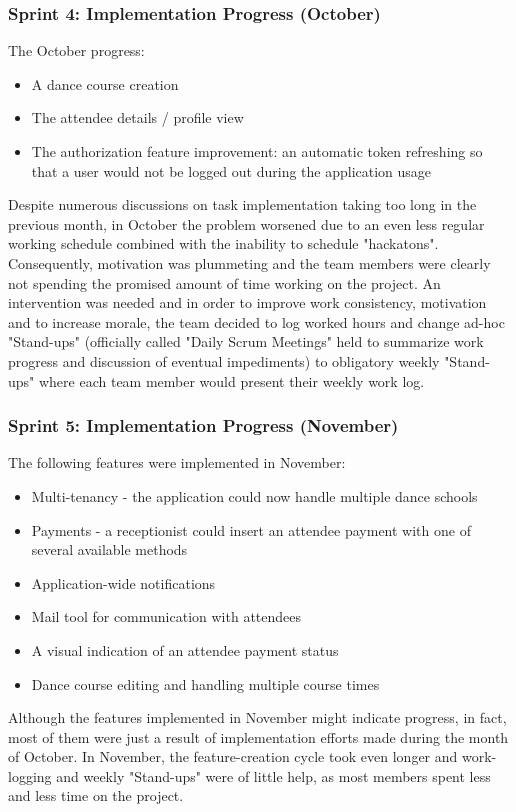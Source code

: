 \documentclass{article}
\begin{document}
\subsubsection{Sprint 4: Implementation Progress (October)}
The October progress:
\begin{itemize}
\item A dance course creation
\item The attendee details / profile view
\item The authorization feature improvement: an automatic token refreshing so that a user would not be logged out during the application usage
\end{itemize}

Despite numerous discussions on task implementation taking too long in the previous month, in October the problem worsened due to an even less regular working schedule combined with the inability to schedule "hackatons". Consequently, motivation was plummeting and the team members were clearly not spending the promised amount of time working on the project. An intervention was needed and in order to improve work consistency, motivation and to increase morale, the team decided to log worked hours and change ad-hoc "Stand-ups" (officially called "Daily Scrum Meetings" held to summarize work progress and discussion of eventual impediments) to obligatory weekly "Stand-ups" where each team member would present their weekly work log.

\subsubsection{Sprint 5: Implementation Progress (November)}
The following features were implemented in November:
\begin{itemize}
\item Multi-tenancy - the application could now handle multiple dance schools 
\item Payments - a receptionist could insert an attendee payment with one of several available methods
\item Application-wide notifications
\item Mail tool for communication with attendees
\item A visual indication of an attendee payment status
\item Dance course editing and handling multiple course times
\end{itemize}
Although the features implemented in November might indicate progress, in fact, most of them were just a result of implementation efforts made during the month of October. In November, the feature-creation cycle took even longer and work-logging and weekly "Stand-ups" were of little help, as most members spent less and less time on the project.
\end{document}
